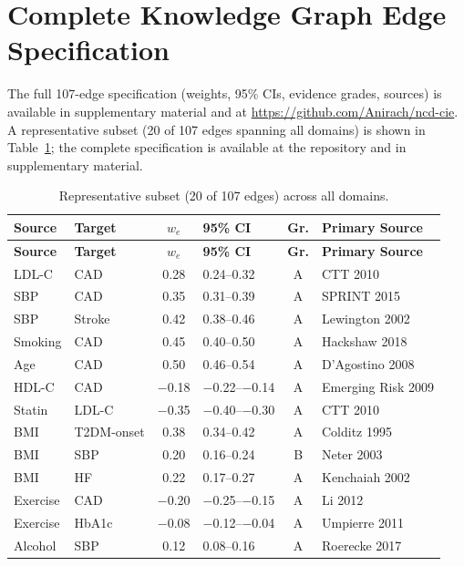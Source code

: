 \documentclass[runningheads]{llncs}
\begin{document}
\appendix
\section{Complete Knowledge Graph Edge Specification}\label{app:edges}

The full 107-edge specification (weights, 95\% CIs, evidence grades,
sources) is available in supplementary material and at
\url{https://github.com/Anirach/ncd-cie}.
A representative subset (20 of 107 edges spanning all domains)
is shown in Table~\ref{tab:edges}; the complete specification is
available at the repository and in supplementary material.

{\footnotesize
\renewcommand{\arraystretch}{1.05}
\begin{longtable}{@{}p{2.0cm}p{2.0cm}cp{1.4cm}cp{2.8cm}@{}}
\caption{Representative subset (20 of 107 edges) across all domains.}\label{tab:edges}\\
\toprule
\textbf{Source} & \textbf{Target} & \textbf{$w_e$} & \textbf{95\% CI} & \textbf{Gr.} & \textbf{Primary Source} \\
\midrule
\endfirsthead
\toprule
\textbf{Source} & \textbf{Target} & \textbf{$w_e$} & \textbf{95\% CI} & \textbf{Gr.} & \textbf{Primary Source} \\
\midrule
\endhead
\bottomrule
\endlastfoot
LDL-C & CAD & 0.28 & 0.24--0.32 & A & CTT 2010 \\
SBP & CAD & 0.35 & 0.31--0.39 & A & SPRINT 2015 \\
SBP & Stroke & 0.42 & 0.38--0.46 & A & Lewington 2002 \\
Smoking & CAD & 0.45 & 0.40--0.50 & A & Hackshaw 2018 \\
Age & CAD & 0.50 & 0.46--0.54 & A & D'Agostino 2008 \\
HDL-C & CAD & $-$0.18 & $-$0.22--$-$0.14 & A & Emerging Risk 2009 \\
Statin & LDL-C & $-$0.35 & $-$0.40--$-$0.30 & A & CTT 2010 \\
BMI & T2DM-onset & 0.38 & 0.34--0.42 & A & Colditz 1995 \\
BMI & SBP & 0.20 & 0.16--0.24 & B & Neter 2003 \\
BMI & HF & 0.22 & 0.17--0.27 & A & Kenchaiah 2002 \\
Exercise & CAD & $-$0.20 & $-$0.25--$-$0.15 & A & Li 2012 \\
Exercise & HbA1c & $-$0.08 & $-$0.12--$-$0.04 & A & Umpierre 2011 \\
Alcohol & SBP & 0.12 & 0.08--0.16 & A & Roerecke 2017 \\

\end{longtable}}
\end{document}
